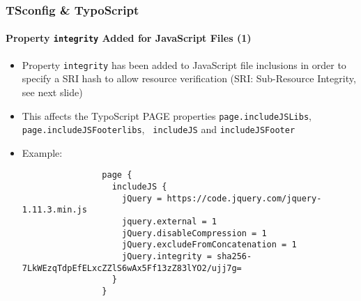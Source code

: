 \begin{frame}[fragile]
	\frametitle{TSconfig \& TypoScript}
	\framesubtitle{Property \texttt{integrity} Added for JavaScript Files (1)}

	\lstset{basicstyle=\tiny\ttfamily}

	\begin{itemize}

		\item Property \texttt{integrity} has been added to JavaScript file inclusions in
			order to specify a SRI hash to allow resource verification\newline
			(SRI: Sub-Resource Integrity, see next slide)

		\item This affects the TypoScript PAGE properties \texttt{page.includeJSLibs},
			\texttt{page.includeJSFooterlibs}, \texttt{ includeJS} and
			\texttt{includeJSFooter}

		\item Example:

			\begin{lstlisting}
				page {
				  includeJS {
				    jQuery = https://code.jquery.com/jquery-1.11.3.min.js
				    jquery.external = 1
				    jQuery.disableCompression = 1
				    jQuery.excludeFromConcatenation = 1
				    jQuery.integrity = sha256-7LkWEzqTdpEfELxcZZlS6wAx5Ff13zZ83lYO2/ujj7g=
				  }
				}
			\end{lstlisting}

	\end{itemize}

\end{frame}


